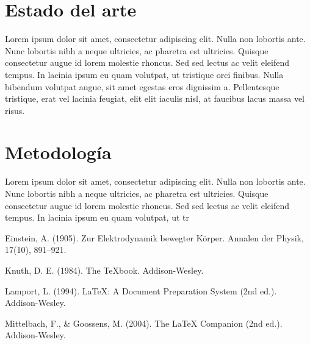 \documentclass[12pt,oneside]{book}
\begin{document}
\chapter{Estado del arte}
Lorem ipsum dolor sit amet, consectetur adipiscing elit. Nulla non lobortis ante. Nunc lobortis nibh a neque ultricies, ac pharetra est ultricies. Quisque consectetur augue id lorem molestie rhoncus. Sed sed lectus ac velit eleifend tempus. In lacinia ipsum eu quam volutpat, ut tristique orci finibus. Nulla bibendum volutpat augue, sit amet egestas eros dignissim a. Pellentesque tristique, erat vel lacinia feugiat, elit elit iaculis nisl, at faucibus lacus massa vel risus.

\chapter{Metodología}
Lorem ipsum dolor sit amet, consectetur adipiscing elit. Nulla non lobortis ante. Nunc lobortis nibh a neque ultricies, ac pharetra est ultricies. Quisque consectetur augue id lorem molestie rhoncus. Sed sed lectus ac velit eleifend tempus. In lacinia ipsum eu quam volutpat, ut tr

\begin{thebibliography}{9}
	Einstein, A. (1905). Zur Elektrodynamik bewegter Körper. Annalen der Physik, 17(10), 891–921.
	
	Knuth, D. E. (1984). The TeXbook. Addison-Wesley.
	
	Lamport, L. (1994). LaTeX: A Document Preparation System (2nd ed.). Addison-Wesley.
	
	Mittelbach, F., \& Goossens, M. (2004). The LaTeX Companion (2nd ed.). Addison-Wesley.
\end{thebibliography}
\end{document}

